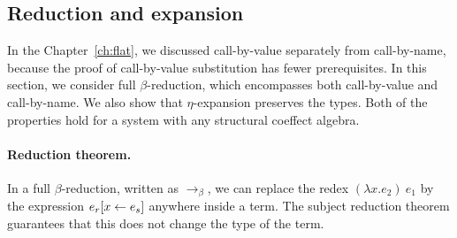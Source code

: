\subsection{Reduction and expansion}

In the Chapter~\ref{ch:flat}, we discussed call-by-value separately from call-by-name, because the
proof of call-by-value substitution has fewer prerequisites. In this section, we consider full
$\beta$-reduction, which encompasses both call-by-value and call-by-name. We also show that 
$\eta$-expansion preserves the types. Both of the properties hold for a system with any
structural coeffect algebra.

\paragraph{Reduction theorem.} In a full $\beta$-reduction,
written as $\rightarrow_\beta$, we can replace the redex $(\lambda x.e_2)~e_1$ by the
expression $e_r[x \leftarrow e_s]$ anywhere inside a term. The subject reduction theorem
guarantees that this does not change the type of the term.

